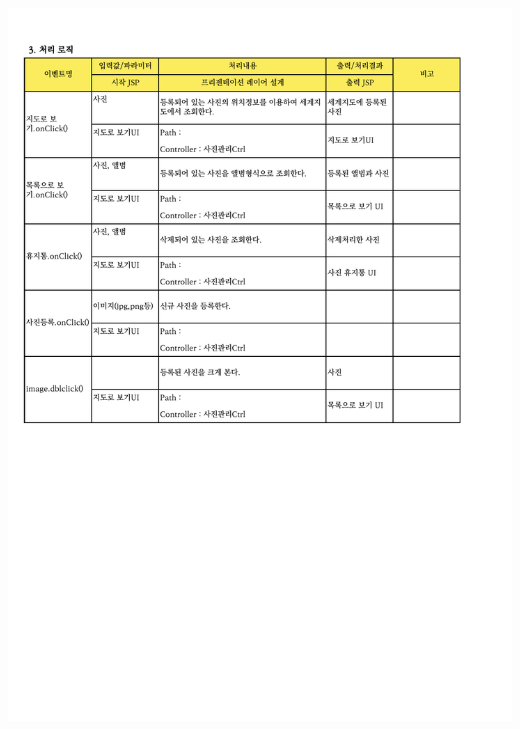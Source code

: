 {{{{{{{{{{{{{{{{{{{{{{{{{{{{{{{{{{{\includegraphics[width=20cm]{./Figure/Analysis/Display/photo/photo_02.pdf} \\
}}}}}}}}}}}}}}}}}}}}}}}}}}}}}}}}}}}
